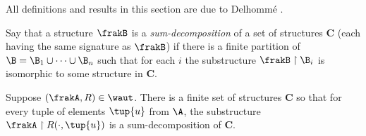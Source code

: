 All definitions and results in this section are due to Delhomm\'e \cite{Delh04}.
\begin{definition} 
Say that a structure $\frakB$ is a {\em sum-decomposition} of a set of structures
$\mathbf{C}$ (each having the same signature as $\frakB$) if there is a finite partition of $\B
= \B_1 \cup \cdots \cup \B_n$ such that for each $i$ the substructure $\frakB
\restriction \B_i$ is isomorphic to some structure in $\mathbf{C}$.
\end{definition}

\begin{theorem} \label{thm:sumaug}
Suppose $(\frakA,R) \in \waut$.
There is a finite set of
structures $\mathbf{C}$ so that for every tuple of elements $\tup{u}$ from $\A$, the
substructure ${\frakA} \restriction R(\cdot,\tup{u})$ is a sum-decomposition
of $\mathbf{C}$.
\end{theorem}


